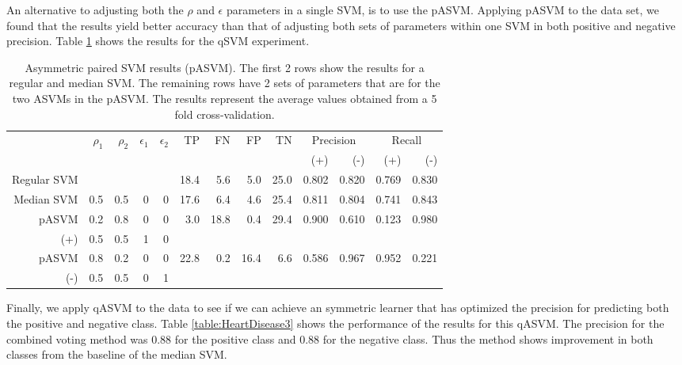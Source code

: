 \documentclass[twoside,11pt]{article}
\begin{document}
An alternative to adjusting both the $\rho$ and $\epsilon$ parameters in a single SVM, is to use the pASVM. Applying pASVM to the data set, we found that the results yield better accuracy than that of adjusting both sets of parameters within one SVM in both positive and negative precision. Table \ref{table:HeartDisease2} shows the results for the qSVM experiment. 

\begin{table}[htbp]\label{table:HeartDisease2}
  \centering
    \begin{tabular}{rrrrr|rrrrrrrr}
    \hline
    &\multirow{2}{*}{$\rho_1$} & \multirow{2}{*}{$\rho_2$} & \multirow{2}{*}{$\epsilon_1$} & \multirow{2}{*}{$\epsilon_2$} & \multirow{2}{*}{TP}    & \multirow{2}{*}{FN}    & \multirow{2}{*}{FP}    & \multirow{2}{*}{TN} & \multicolumn{2}{c}{Precision} & \multicolumn{2}{c}{Recall}\\
    &&&&&&&&&  (+) &  (-) &  (+) &  (-) \bigstrut\\
    \hline
    \hline
 Regular SVM &       &       &       &       & 18.4  & 5.6   & 5.0   & 25.0  & 0.802 & 0.820 & 0.769 & 0.830 \bigstrut\\
\hline
Median SVM & 0.5   & 0.5   & 0     & 0     & 17.6  & 6.4   & 4.6   & 25.4  & 0.811 & 0.804 & 0.741 & 0.843 \bigstrut\\
\hline
pASVM & 0.2   & 0.8   & 0     & 0     & 3.0   & 18.8  & 0.4   & 29.4  & 0.900 & 0.610 & 0.123 & 0.980 \bigstrut[t]\\
(+)   & 0.5   & 0.5   & 1     & 0     &       &       &       &       &       &       &       &  \bigstrut[b]\\
\hline
pASVM & 0.8   & 0.2   & 0     & 0     & 22.8  & 0.2   & 16.4  & 6.6   & 0.586 & 0.967 & 0.952 & 0.221 \bigstrut[t]\\
(-)   & 0.5   & 0.5   & 0     & 1     &       &       &       &       &       &       &       &  \bigstrut[b]\\
    \hline
    \hline
    \end{tabular}%
    \caption{Asymmetric paired SVM results (pASVM). The first 2 rows show the results for a regular and median SVM. The remaining rows have 2 sets of parameters that are for the two ASVMs in the pASVM. The results represent the average values obtained from a 5 fold cross-validation.}
\end{table}%

Finally, we apply qASVM to the data to see if we can achieve an symmetric learner that has optimized the precision for predicting both the positive and negative class. Table \ref{table:HeartDisease3} shows the performance of the results for this qASVM. The precision for the combined voting method was 0.88 for the positive class and 0.88 for the negative class. Thus the method shows improvement in both classes from the baseline of the median SVM.
\end{document}

